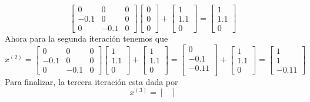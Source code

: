 \begin{enumerate}
\begin{solution}
$$\begin{bmatrix}
           0&0&0\\
           -0.1&0&0\\
           0&-0.1&0
       \end{bmatrix}\begin{bmatrix}
           0\\
           0\\
           0
       \end{bmatrix}+\begin{bmatrix}
            1\\
            1.1\\
            0
        \end{bmatrix}=\begin{bmatrix}
            1\\
            1.1\\
            0
        \end{bmatrix}$$
        Ahora para la segunda iteración tenemos que
        $$x^{(2)}=\begin{bmatrix}
           0&0&0\\
           -0.1&0&0\\
           0&-0.1&0
       \end{bmatrix}\begin{bmatrix}
            1\\
            1.1\\
            0
        \end{bmatrix}+\begin{bmatrix}
            1\\
            1.1\\
            0
        \end{bmatrix}=\begin{bmatrix}
           0\\
           -0.1\\
           -0.11\\
        \end{bmatrix}+\begin{bmatrix}
            1\\
            1.1\\
            0
        \end{bmatrix}=\begin{bmatrix}
            1\\
            1\\
            -0.11
        \end{bmatrix}$$
        Para finalizar, la tercera iteración esta dada por
        $$x^{(3)}=\begin{bmatrix}

\end{bmatrix}$$
\end{solution}
\end{enumerate}
